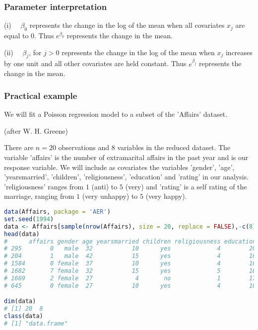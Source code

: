 \documentclass[border=5mm, convert, usenames, dvipsnames,beamer]{standalone}
\begin{document}
\begin{frame}[ fragile]{}
\frametitle{Parameter interpretation}

\footnotesize
\vspace{-30}
\noindent
(i) \ \ $\beta_{0}$ represents the change in the log of the mean when all covariates $x_{j}$ are equal to 0. Thus $e^{\beta_{0}}$ represents the change in the mean.


\vspace{15}
\noindent
(ii) \ \ $\beta_{j}$, for $j >0$ represents the change in the log of the mean when $x_{j}$ increases by one unit and all other covariates are held constant. Thus $e^{\beta_{j}}$ represents the change in the mean.

\end{frame}

\begin{frame}[ fragile]{}
\frametitle{Practical example}

\footnotesize
\vspace{35}
\noindent
We will fit a Poisson regression model to a subset of the 'Affairs' dataset.

\tiny
(after W. H. Greene)
\par

\footnotesize
\vspace{10}
\noindent
There are $n= 20$ observations  and $8$ variables in the reduced dataset. The variable 'affairs' is the number of extramarital affairs in the past year and is our response variable. We will include as covariates the variables 'gender', 'age', 'yearsmarried', 'children', 'religiousness', 'education' and 'rating' in our analysis. 'religiousness' ranges from $1$ (anti) to $5$ (very) and 'rating' is a self rating of the marriage, ranging from $1$ (very unhappy) to $5$ (very happy).

\par 

\tiny
\begin{lstlisting}[language=R]
data(Affairs, package = 'AER')
set.seed(1994)
data <- Affairs[sample(nrow(Affairs), size = 20, replace = FALSE),-c(8)]
head(data)
#      affairs gender age yearsmarried children religiousness education rating
# 295        0   male  32           10      yes             4        20      4
# 204        1   male  42           15      yes             4        16      5
# 1584       0 female  37           10      yes             4        16      5
# 1682       7 female  32           15      yes             5        18      4
# 1669       2 female  27            4       no             1        17      1
# 645        0 female  27           10      yes             4        16      3

dim(data)
# [1] 20  8
class(data)
# [1] "data.frame"
\end{lstlisting}
\par
\end{frame}
\end{document}
